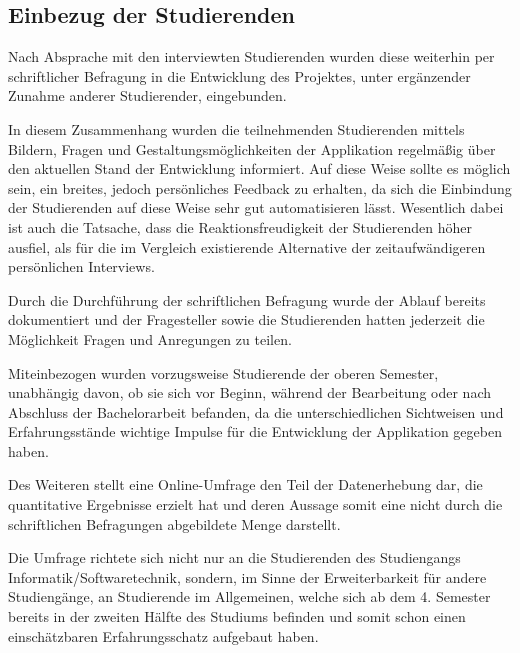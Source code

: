 \documentclass[bibliography=totoc,listof=totoc,BCOR=5mm,DIV=12,oneside]{scrbook}
\begin{document}
\subsection{Einbezug der Studierenden}
\par Nach Absprache mit den interviewten Studierenden wurden diese weiterhin per schriftlicher Befragung in die Entwicklung des Projektes, unter ergänzender Zunahme anderer Studierender, eingebunden.
\par In diesem Zusammenhang wurden die teilnehmenden Studierenden mittels Bildern, Fragen und Gestaltungsmöglichkeiten der Applikation regelmäßig über den aktuellen Stand der Entwicklung informiert. Auf diese Weise sollte es möglich sein, ein breites, jedoch persönliches Feedback zu erhalten, da sich die Einbindung der Studierenden auf diese Weise sehr gut automatisieren lässt. Wesentlich dabei ist auch die Tatsache, dass die Reaktionsfreudigkeit der Studierenden höher ausfiel, als für die im Vergleich existierende Alternative der zeitaufwändigeren persönlichen Interviews.
\par Durch die Durchführung der schriftlichen Befragung wurde der Ablauf bereits dokumentiert und der Fragesteller sowie die Studierenden hatten jederzeit die Möglichkeit Fragen und Anregungen zu teilen.
\par Miteinbezogen wurden vorzugsweise Studierende der oberen Semester, unabhängig davon, ob sie sich vor Beginn, während der Bearbeitung oder nach Abschluss der Bachelorarbeit befanden, da die unterschiedlichen Sichtweisen und Erfahrungsstände wichtige Impulse für die Entwicklung der Applikation gegeben haben.
\par \medskip Des Weiteren stellt eine Online-Umfrage den Teil der Datenerhebung dar, die quantitative Ergebnisse erzielt hat und deren Aussage somit eine nicht durch die schriftlichen Befragungen abgebildete Menge darstellt.
\par Die Umfrage richtete sich nicht nur an die Studierenden des Studiengangs Informatik/Softwaretechnik, sondern, im Sinne der Erweiterbarkeit für andere Studiengänge, an Studierende im Allgemeinen, welche sich ab dem 4. Semester bereits in der zweiten Hälfte des Studiums befinden und somit schon einen einschätzbaren Erfahrungsschatz aufgebaut haben.
\end{document}
